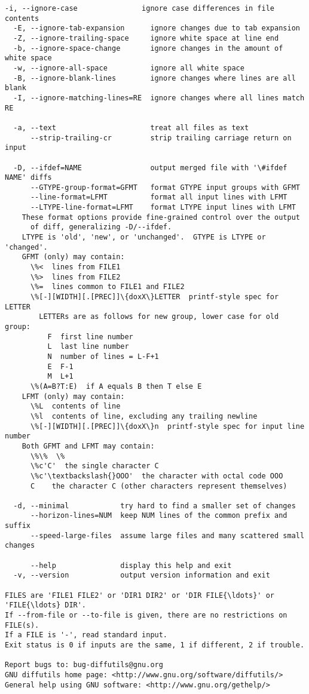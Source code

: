 \documentclass[11pt]{article}
\begin{document}
\begin{Verbatim}[commandchars=\\\{\}]
  -i, --ignore-case               ignore case differences in file contents
  -E, --ignore-tab-expansion      ignore changes due to tab expansion
  -Z, --ignore-trailing-space     ignore white space at line end
  -b, --ignore-space-change       ignore changes in the amount of white space
  -w, --ignore-all-space          ignore all white space
  -B, --ignore-blank-lines        ignore changes where lines are all blank
  -I, --ignore-matching-lines=RE  ignore changes where all lines match RE

  -a, --text                      treat all files as text
      --strip-trailing-cr         strip trailing carriage return on input

  -D, --ifdef=NAME                output merged file with '\#ifdef NAME' diffs
      --GTYPE-group-format=GFMT   format GTYPE input groups with GFMT
      --line-format=LFMT          format all input lines with LFMT
      --LTYPE-line-format=LFMT    format LTYPE input lines with LFMT
    These format options provide fine-grained control over the output
      of diff, generalizing -D/--ifdef.
    LTYPE is 'old', 'new', or 'unchanged'.  GTYPE is LTYPE or 'changed'.
    GFMT (only) may contain:
      \%<  lines from FILE1
      \%>  lines from FILE2
      \%=  lines common to FILE1 and FILE2
      \%[-][WIDTH][.[PREC]]\{doxX\}LETTER  printf-style spec for LETTER
        LETTERs are as follows for new group, lower case for old group:
          F  first line number
          L  last line number
          N  number of lines = L-F+1
          E  F-1
          M  L+1
      \%(A=B?T:E)  if A equals B then T else E
    LFMT (only) may contain:
      \%L  contents of line
      \%l  contents of line, excluding any trailing newline
      \%[-][WIDTH][.[PREC]]\{doxX\}n  printf-style spec for input line number
    Both GFMT and LFMT may contain:
      \%\%  \%
      \%c'C'  the single character C
      \%c'\textbackslash{}OOO'  the character with octal code OOO
      C    the character C (other characters represent themselves)

  -d, --minimal            try hard to find a smaller set of changes
      --horizon-lines=NUM  keep NUM lines of the common prefix and suffix
      --speed-large-files  assume large files and many scattered small changes

      --help               display this help and exit
  -v, --version            output version information and exit

FILES are 'FILE1 FILE2' or 'DIR1 DIR2' or 'DIR FILE{\ldots}' or 'FILE{\ldots} DIR'.
If --from-file or --to-file is given, there are no restrictions on FILE(s).
If a FILE is '-', read standard input.
Exit status is 0 if inputs are the same, 1 if different, 2 if trouble.

Report bugs to: bug-diffutils@gnu.org
GNU diffutils home page: <http://www.gnu.org/software/diffutils/>
General help using GNU software: <http://www.gnu.org/gethelp/>

    \end{Verbatim}
\end{document}

